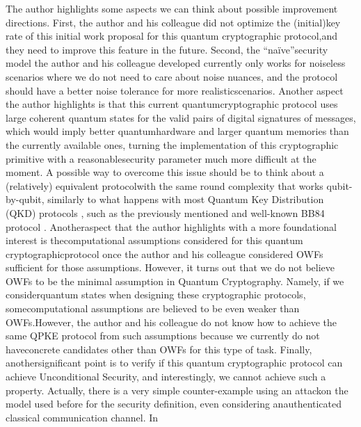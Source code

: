 \documentclass[12pt]{article}
\begin{document}
    The author highlights some aspects we can think about possible improvement directions. First, the author and his colleague did not optimize the (initial)\break key rate of this initial work proposal for this quantum cryptographic protocol,\break and they need to improve this feature in the future. Second, the ``na\"{i}ve''\break security model the author and his colleague developed currently only works for noiseless scenarios where we do not need to care about noise nuances, and the protocol should have a better noise tolerance for more realistic\break scenarios. Another aspect the author highlights is that this current quantum\break cryptographic protocol uses large coherent quantum states for the valid pairs of digital signatures of messages, which would imply better quantum\break hardware and larger quantum memories than the currently available ones, turning the implementation of this cryptographic primitive with a reasonable\break security parameter much more difficult at the moment. A possible way to overcome this issue should be to think about a (relatively) equivalent protocol\break with the same round complexity that works qubit-by-qubit, similarly to what happens with most Quantum Key Distribution (QKD) protocols \cite{ekert:quantum-cryptography-based-bell-theorem:1991:03-2024,bennett-brassard-mermin:quantum-cryptography-without-bell-theorem:1992:03-2024,bennett:quantum-cryptography-using-any-two-nonorthogonal-states:1992:03-2024,mu-seberry-zheng:shared-cryptographic-bits-quantized-quadrature-phase-amplitudes-light:1996:03-2024,dagmar:optimal-eavesdropping-quantum-cryptography-six-states:1998:03-2024,bechmann-pasquinucci:incoherent-coherent-eavesdropping-six-state-protocol-quantum-cryptography:1999:03-2024,hwang:quantum-key-distribution-high-loss-toward-global-secure-communication:2003:03-2024,branciard-gisin-kraus-scarani:security-two-quantum-cryptography-protocols-using-same-four-qubit-states:2005:03-2024}, such as the previously mentioned and well-known BB84 protocol \cite{bennett-brassard:quantum-cryptography-public-key-distribution-coin-tossing:1984:03-2024,bennett-brassard:quantum-cryptography-public-key-distribution-coin-tossing:2014:03-2024}. Another\break aspect that the author highlights with a more foundational interest is the\break computational assumptions considered for this quantum cryptographic\break protocol once the author and his colleague considered OWFs sufficient for those assumptions. However, it turns out that we do not believe OWFs to be the minimal assumption in Quantum Cryptography. Namely, if we consider\break quantum states when designing these cryptographic protocols, some\break computational assumptions are believed to be even weaker than OWFs.\break However, the author and his colleague do not know how to achieve the same QPKE protocol from such assumptions because we currently do not have\break concrete candidates other than OWFs for this type of task. Finally, another\break significant point is to verify if this quantum cryptographic protocol can achieve Unconditional Security, and interestingly, we cannot achieve such a property. Actually, there is a very simple counter-example using an attack\break on the model used before for the security definition, even considering an\break authenticated classical communication channel. In 
\end{document}
